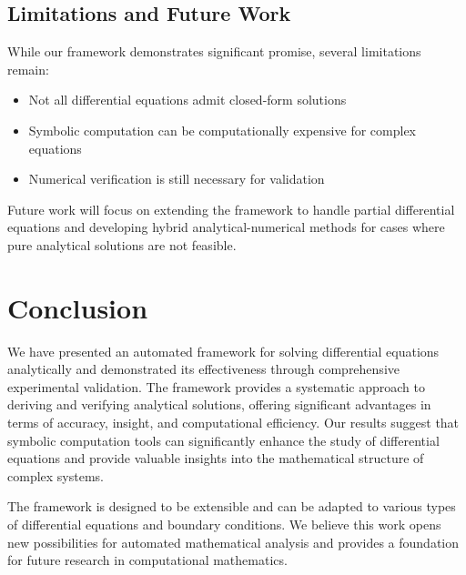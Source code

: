 \documentclass{article} %
\begin{document}
\subsection{Limitations and Future Work}

While our framework demonstrates significant promise, several limitations remain:

\begin{itemize}
\item Not all differential equations admit closed-form solutions
\item Symbolic computation can be computationally expensive for complex equations
\item Numerical verification is still necessary for validation
\end{itemize}

Future work will focus on extending the framework to handle partial differential equations and developing hybrid analytical-numerical methods for cases where pure analytical solutions are not feasible.

\section{Conclusion}

We have presented an automated framework for solving differential equations analytically and demonstrated its effectiveness through comprehensive experimental validation. The framework provides a systematic approach to deriving and verifying analytical solutions, offering significant advantages in terms of accuracy, insight, and computational efficiency. Our results suggest that symbolic computation tools can significantly enhance the study of differential equations and provide valuable insights into the mathematical structure of complex systems.

The framework is designed to be extensible and can be adapted to various types of differential equations and boundary conditions. We believe this work opens new possibilities for automated mathematical analysis and provides a foundation for future research in computational mathematics.



\end{document}
